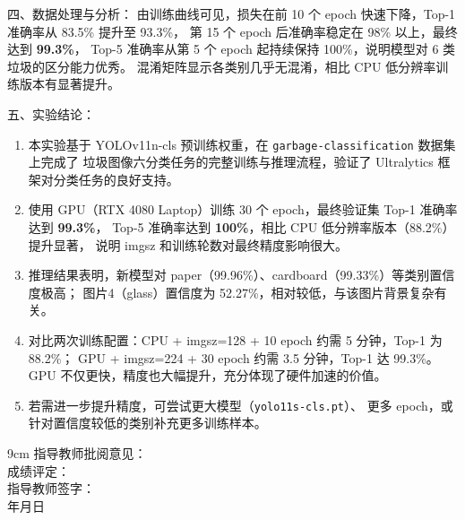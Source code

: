 \documentclass[12pt, a4paper]{article}
\begin{document}
\begin{labbox}{四、数据处理与分析：}{}
\vspace{0.2cm}
由训练曲线可见，损失在前 10 个 epoch 快速下降，Top-1 准确率从 83.5\% 提升至 93.3\%，
第 15 个 epoch 后准确率稳定在 98\% 以上，最终达到 \textbf{99.3\%}，
Top-5 准确率从第 5 个 epoch 起持续保持 100\%，说明模型对 6 类垃圾的区分能力优秀。
混淆矩阵显示各类别几乎无混淆，相比 CPU 低分辨率训练版本有显著提升。

\end{labbox}


\newpage
\begin{labbox}{五、实验结论：}{}

\begin{enumerate}[leftmargin=2em, itemsep=0.4em]
    \item 本实验基于 YOLOv11n-cls 预训练权重，在 \texttt{garbage-classification} 数据集上完成了
          垃圾图像六分类任务的完整训练与推理流程，验证了 Ultralytics 框架对分类任务的良好支持。

    \item 使用 GPU（RTX 4080 Laptop）训练 30 个 epoch，最终验证集 Top-1 准确率达到 \textbf{99.3\%}，
          Top-5 准确率达到 \textbf{100\%}，相比 CPU 低分辨率版本（88.2\%）提升显著，
          说明 imgsz 和训练轮数对最终精度影响很大。

    \item 推理结果表明，新模型对 paper（99.96\%）、cardboard（99.33\%）等类别置信度极高；
          图片4（glass）置信度为 52.27\%，相对较低，与该图片背景复杂有关。

    \item 对比两次训练配置：CPU + imgsz=128 + 10 epoch 约需 5 分钟，Top-1 为 88.2\%；
          GPU + imgsz=224 + 30 epoch 约需 3.5 分钟，Top-1 达 99.3\%。
          GPU 不仅更快，精度也大幅提升，充分体现了硬件加速的价值。

    \item 若需进一步提升精度，可尝试更大模型（\texttt{yolo11s-cls.pt}）、
          更多 epoch，或针对置信度较低的类别补充更多训练样本。
\end{enumerate}

\end{labbox}

\begin{labbox}{}{9cm}
    \hspace{1em}指导教师批阅意见：\\[3.5cm]
    \hspace{1em}成绩评定：\\[2cm]
    \hfill 指导教师签字：\hspace{4em} \\
    \hfill \makebox[3em]{}年\makebox[2em]{}月\makebox[2em]{}日\hspace{2em} \\[0.5em]
\end{labbox}
\end{document}
